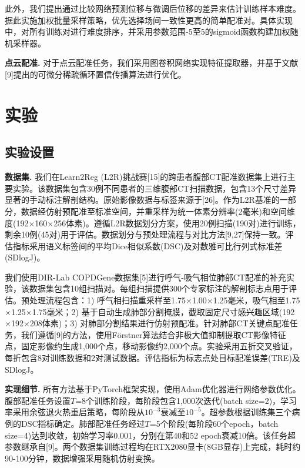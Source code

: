 此外，我们提出通过比较网络预测位移与微调后位移的差异来估计训练样本难度。据此实施加权批量采样策略，优先选择场间一致性更高的简单配准对。具体实现中，对所有训练对进行难度排序，并采用参数范围-5至5的sigmoid函数构建加权随机采样器。

\textbf{点云配准.} 对于点云配准任务，我们采用图卷积网络实现特征提取器，并基于文献[9]提出的可微分稀疏循环置信传播算法进行优化。

\section{实验}

\subsection{实验设置}

\textbf{数据集.} 我们在Learn2Reg (L2R)挑战赛[15]的跨患者腹部CT配准数据集上进行主要实验。该数据集包含30例不同患者的三维腹部CT扫描数据，包含13个尺寸差异显著的手动标注解剖结构。原始影像数据与标签来源于[26]。作为L2R基准的一部分，数据经仿射预配准至标准空间，并重采样为统一体素分辨率(2毫米)和空间维度(192$\times$160$\times$256体素)。遵循L2R数据划分方案，使用20例扫描(190对)进行训练，剩余10例(45对)用于评估。数据划分与预处理流程与对比方法[9,27]保持一致。评估指标采用语义标签间的平均Dice相似系数(DSC)及对数雅可比行列式标准差(SDlogJ)。

我们使用DIR-Lab COPDGene数据集[5]进行呼气-吸气相位肺部CT配准的补充实验，该数据集包含10组扫描对。每组扫描提供300个专家标注的解剖标志点用于评估。预处理流程包含：1) 呼气相扫描重采样至1.75$\times$1.00$\times$1.25毫米，吸气相至1.75$\times$1.25$\times$1.75毫米；2) 基于自动生成肺部分割掩膜，截取固定尺寸感兴趣区域(192$\times$192$\times$208体素)；3) 对肺部分割结果进行仿射预配准。针对肺部CT关键点配准任务，我们遵循[9]的方法，使用Förstner算法结合非极大值抑制提取CT影像特征点，固定影像约生成1,000个点，移动影像约2,000个点。实验采用五折交叉验证，每折包含8对训练数据和2对测试数据。评估指标为标志点处目标配准误差(TRE)及SDlogJ。

\textbf{实现细节.} 所有方法基于PyTorch框架实现，使用Adam优化器进行网络参数优化。腹部配准任务设置$T$=8个训练阶段，每阶段包含1,000次迭代(batch size=2)，学习率采用余弦退火热重启策略，每阶段从$10^{-3}$衰减至$10^{-5}$。超参数根据训练集三个病例的DSC指标确定。肺部配准任务经过$T$=5个阶段(每阶段60个epoch，batch size=4)达到收敛，初始学习率0.001，分别在第40和52 epoch衰减10倍。该任务超参数继承自[9]。两个数据集训练过程均在RTX2080显卡(8GB显存)上完成，耗时约90-100分钟，数据增强采用随机仿射变换。

